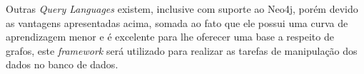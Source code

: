 \par Outras \textit{Query Languages} existem, inclusive com suporte ao Neo4j, porém devido as vantagens apresentadas acima, somada ao fato que ele possui uma curva de aprendizagem menor e é excelente para lhe oferecer uma base a respeito de grafos,  este \textit{framework} será utilizado para realizar as tarefas de manipulação dos dados no banco de dados.

